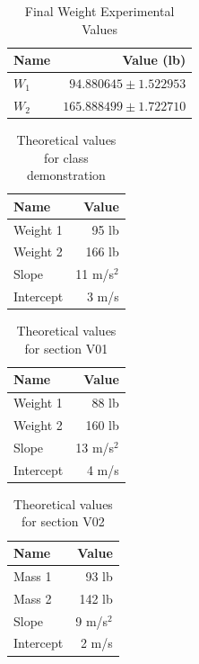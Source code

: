\begin{table}[ht]
    \centering
    \begin{tabular}{|l|r|}
        \hline
        \textbf{Name} & \textbf{Value (lb)} \\
        \hline
        $W_{1}$ & $94.880645 \pm 1.522953$ \\
        $W_{2}$ & $165.888499 \pm 1.722710$ \\
        \hline
    \end{tabular}
    \caption{Final Weight Experimental Values}
    \label{table:00.final}
\end{table}
\begin{table}
    \centering
    \begin{tabular}{|l|r|}
        \hline
        \textbf{Name} & \textbf{Value} \\
        \hline
        Weight 1 & 95 lb \\
        Weight 2 & 166 lb \\
        \hline
        Slope & 11 m/s$^{2}$ \\
        Intercept & 3 m/s \\
        \hline
    \end{tabular}
    \caption{Theoretical values for class demonstration}
    \label{table:00.theoretical.demo}
\end{table}
\begin{table}
    \centering
    \begin{tabular}{|l|r|}
        \hline
        \textbf{Name} & \textbf{Value} \\
        \hline
        Weight 1 & 88 lb \\
        Weight 2 & 160 lb \\
        \hline
        Slope & 13 m/s$^{2}$ \\
        Intercept & 4 m/s \\
        \hline
    \end{tabular}
    \caption{Theoretical values for section V01}
    \label{table:00.theoretical.v01}
\end{table}
\begin{table}
    \centering
    \begin{tabular}{|l|r|}
        \hline
        \textbf{Name} & \textbf{Value} \\
        \hline
        Mass 1 & 93 lb \\
        Mass 2 & 142 lb \\
        \hline
        Slope & 9 m/s$^{2}$ \\
        Intercept & 2 m/s \\
        \hline
    \end{tabular}
    \caption{Theoretical values for section V02}
    \label{table:00.theoretical.v02}
\end{table}
\FloatBarrier
\newpage
